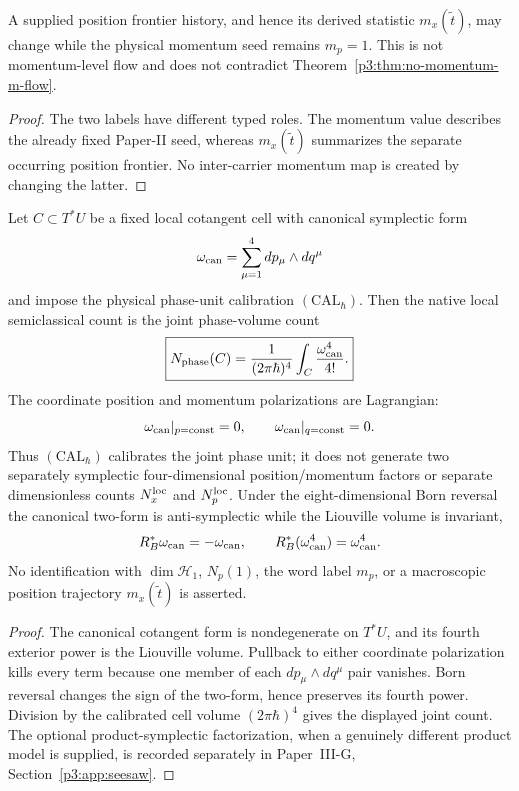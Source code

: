 \documentclass[12pt,a4paper]{article}
\begin{document}
\begin{proposition}
\label{p3:prop:position-unfolding-no-insertion}
A supplied position frontier history, and hence its derived statistic
\(m_x(\widetilde t)\), may change while the
physical momentum seed remains \(m_p=1\).  This is not momentum-level flow and
does not contradict Theorem~\ref{p3:thm:no-momentum-m-flow}.
\end{proposition}

\begin{proof}
The two labels have different typed roles.  The momentum value describes the
already fixed Paper-II seed, whereas \(m_x(\widetilde t)\) summarizes the
separate occurring position frontier.  No inter-carrier momentum map is
created by changing the latter.
\end{proof}

\begin{theorem}
\label{p3:thm:born-liouville-mp-mx-seesaw}
Let \(C\subset T^*U\) be a fixed local cotangent cell with canonical
symplectic form
\[
 \omega_{\rm can}=\sum_{\mu=1}^{4}dp_\mu\wedge dq^\mu
\]
and impose the physical phase-unit calibration \((\mathrm{CAL}_{\hbar})\).
Then the native local semiclassical count is the joint phase-volume count
\[
 \boxed{
 N_{\rm phase}(C)
 =\frac{1}{(2\pi\hbar)^4}
  \int_C\frac{\omega_{\rm can}^{4}}{4!}.}
\]
The coordinate position and momentum polarizations are Lagrangian:
\[
 \omega_{\rm can}|_{p={\rm const}}=0,
 \qquad
 \omega_{\rm can}|_{q={\rm const}}=0.
\]
Thus \((\mathrm{CAL}_{\hbar})\) calibrates the joint phase unit; it does not
generate two separately symplectic four-dimensional position/momentum factors
or separate dimensionless counts \(N_x^{\rm loc}\) and \(N_p^{\rm loc}\).
Under the eight-dimensional Born reversal the canonical two-form is
anti-symplectic while the Liouville volume is invariant,
\[
 R_B^*\omega_{\rm can}=-\omega_{\rm can},
 \qquad
 R_B^*(\omega_{\rm can}^{4})=\omega_{\rm can}^{4}.
\]
No identification with \(\dim\mathcal H_1\), \(N_p(1)\), the word label
\(m_p\), or a macroscopic position trajectory \(m_x(\widetilde t)\) is
asserted.
\end{theorem}

\begin{proof}
The canonical cotangent form is nondegenerate on \(T^*U\), and its fourth
exterior power is the Liouville volume.  Pullback to either coordinate
polarization kills every term because one member of each
\(dp_\mu\wedge dq^\mu\) pair vanishes.  Born reversal changes the sign of the
two-form, hence preserves its fourth power.  Division by the calibrated cell
volume \((2\pi\hbar)^4\) gives the displayed joint count.  The optional
product-symplectic factorization, when a genuinely different product model is
supplied, is recorded separately in Paper~III-G, Section~\ref{p3:app:seesaw}.
\end{proof}
\end{document}
